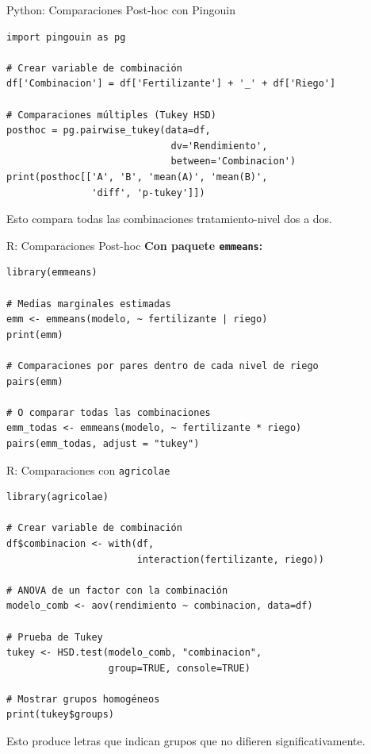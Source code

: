 \documentclass[aspectratio=169]{beamer}
\begin{document}
\begin{frame}[fragile]{Python: Comparaciones Post-hoc con Pingouin}
\small
\begin{verbatim}
import pingouin as pg

# Crear variable de combinación
df['Combinacion'] = df['Fertilizante'] + '_' + df['Riego']

# Comparaciones múltiples (Tukey HSD)
posthoc = pg.pairwise_tukey(data=df,
                             dv='Rendimiento',
                             between='Combinacion')
print(posthoc[['A', 'B', 'mean(A)', 'mean(B)',
               'diff', 'p-tukey']])
\end{verbatim}

\vspace{0.2cm}
Esto compara todas las combinaciones tratamiento-nivel dos a dos.
\end{frame}

\begin{frame}[fragile]{R: Comparaciones Post-hoc}
\small
\textbf{Con paquete \texttt{emmeans}:}
\begin{verbatim}
library(emmeans)

# Medias marginales estimadas
emm <- emmeans(modelo, ~ fertilizante | riego)
print(emm)

# Comparaciones por pares dentro de cada nivel de riego
pairs(emm)

# O comparar todas las combinaciones
emm_todas <- emmeans(modelo, ~ fertilizante * riego)
pairs(emm_todas, adjust = "tukey")
\end{verbatim}
\end{frame}

\begin{frame}[fragile]{R: Comparaciones con \texttt{agricolae}}
\small
\begin{verbatim}
library(agricolae)

# Crear variable de combinación
df$combinacion <- with(df,
                       interaction(fertilizante, riego))

# ANOVA de un factor con la combinación
modelo_comb <- aov(rendimiento ~ combinacion, data=df)

# Prueba de Tukey
tukey <- HSD.test(modelo_comb, "combinacion",
                  group=TRUE, console=TRUE)

# Mostrar grupos homogéneos
print(tukey$groups)
\end{verbatim}

Esto produce letras que indican grupos que no difieren significativamente.
\end{frame}
\end{document}
